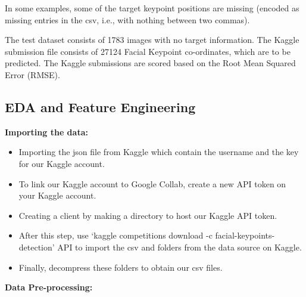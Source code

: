 \documentclass[conference]{IEEEtran}
\begin{document}
In some examples, some of the target keypoint positions are missing (encoded as missing entries in the csv, i.e., with nothing between two commas).

The test dataset consists of 1783 images with no target information. The Kaggle submission file consists of 27124 Facial Keypoint co-ordinates, which are to be predicted. The Kaggle submissions are scored based on the Root Mean Squared Error (RMSE).

\subsection{EDA and Feature Engineering}

\textbf{Importing the data:}

\begin{itemize}
    \item Importing the json file from Kaggle which contain the username and the key for our Kaggle account. 
    
    \item To link our Kaggle account to Google Collab, create a new API token on your Kaggle account.
    
    \item Creating a client by making a directory to host our Kaggle API token.
    
    \item After this step, use ‘kaggle competitions download -c facial-keypoints-detection’ API to import the csv and folders from the data source on Kaggle.
    
    \item Finally, decompress these folders to obtain our csv files.
\end{itemize}

\textbf{Data Pre-processing:}
\end{document}
